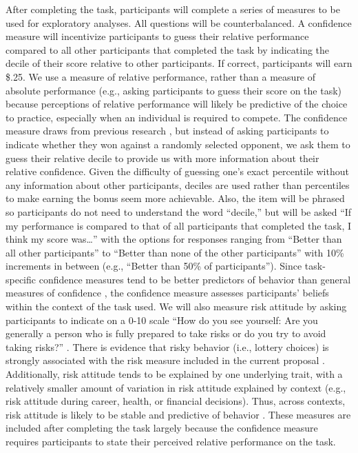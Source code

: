 \documentclass[a4paper, nobind]{templates/ociamthesis}
\begin{document}
After completing the task, participants will complete a series of measures to be used for exploratory analyses. All questions will be counterbalanced. A confidence measure will incentivize participants to guess their relative performance compared to all other participants that completed the task by indicating the decile of their score relative to other participants. If correct, participants will earn \$.25. We use a measure of relative performance, rather than a measure of absolute performance (e.g., asking participants to guess their score on the task) because perceptions of relative performance will likely be predictive of the choice to practice, especially when an individual is required to compete. The confidence measure draws from previous research \autocite{Niederle2007}, but instead of asking participants to indicate whether they won against a randomly selected opponent, we ask them to guess their relative decile to provide us with more information about their relative confidence. Given the difficulty of guessing one's exact percentile without any information about other participants, deciles are used rather than percentiles to make earning the bonus seem more achievable. Also, the item will be phrased so participants do not need to understand the word ``decile,'' but will be asked ``If my performance is compared to that of all participants that completed the task, I think my score was\ldots{}'' with the options for responses ranging from ``Better than all other participants'' to ``Better than none of the other participants'' with 10\% increments in between (e.g., ``Better than 50\% of participants''). Since task-specific confidence measures tend to be better predictors of behavior than general measures of confidence \autocite[see][ for review]{Oney2015}, the confidence measure assesses participants' beliefs within the context of the task used. We will also measure risk attitude by asking participants to indicate on a 0-10 scale ``How do you see yourself: Are you generally a person who is fully prepared to take risks or do you try to avoid taking risks?'' \autocite{Dohmen2011b}. There is evidence that risky behavior (i.e., lottery choices) is strongly associated with the risk measure included in the current proposal \autocite{Dohmen2011b}. Additionally, risk attitude tends to be explained by one underlying trait, with a relatively smaller amount of variation in risk attitude explained by context (e.g., risk attitude during career, health, or financial decisions). Thus, across contexts, risk attitude is likely to be stable and predictive of behavior \autocite{Dohmen2011b}. These measures are included after completing the task largely because the confidence measure requires participants to state their perceived relative performance on the task.
\end{document}
